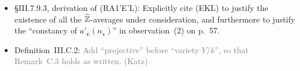 \documentclass[12pt]{article}
\begin{document}
\begin{itemize}
    (These changes are important for \S10, but not for \S9.)
    
    One could also remark that \emph{morally}, when applying (RA1) here (towards (RA1')) and elsewhere (via (RA1'), (RA1'E), and (RA1'E')),
    it suffices to work with boxes $\mcal{B}(\bm{Z})$ of \emph{intermediate} ``lopsidedness'' (say $\leq Z/Z^{1-\hbar} = Z^\hbar$),
    and with moduli $n_0$ and shifts $\abs{t}$ of \emph{small} size (say $\leq Z^{\hbar^2}$).
    
    \item \S{III.7.9.3}, derivation of (RA1’E’L):
    Explicitly cite (EKL) to justify the existence of all the $\widehat{\mathbb{Z}}$-averages under consideration,
    and furthermore to justify the ``constancy of $a'_{\bm{c}}(n_\star)$'' in observation~(2) on p.~57.
    
    \item Definition~III.C.2:
    \textcolor{gray}{Add ``projective'' before ``variety $Y/k$'',
    so that Remark~C.3 holds as written.
    (Katz)}
    
    
    
    

\end{itemize}
\end{document}
